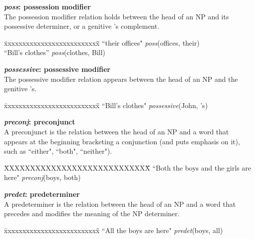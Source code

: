 \documentclass[11pt,letter]{article}
\begin{document}
\noindent\textbf{\emph{poss}: possession modifier}\\
The possession modifier relation holds between the head of an NP and its possessive determiner, or a genitive 's complement.
\begin{tabbing}
\hspace{1cm} \= xxxxxxxxxxxxxxxxxxxxxxxxxx\= \hspace{.5cm}\=  \kill
\>  ``their offices" \> \> \emph{poss}(offices, their)\\
\> ``Bill's clothes'' \> \> \emph{poss}(clothes, Bill)\\
\end{tabbing}

\noindent\textbf{\emph{possessive}: possessive modifier}\\
The possessive modifier relation appears between the head of an NP and the genitive 's.
\begin{tabbing}
\hspace{1cm} \= xxxxxxxxxxxxxxxxxxxxxxxxxx\= \hspace{.5cm}\=  \kill
\>  ``Bill's clothes" \> \> \emph{possessive}(John, 's)\\
\end{tabbing}

\noindent\textbf{\emph{preconj}: preconjunct}\\
A preconjunct is the relation between the head of an NP and a word that appears at the beginning bracketing a conjunction (and puts emphasis on it), such as ``either", ``both", ``neither").
\begin{tabbing}
	\hspace{1cm} \=XXXXXXXXXXXXXXXXXXXXXXXXXXXX\= \hspace{1cm}\=  \kill
\>  ``Both the boys and the girls are here" \> \> \emph{preconj}(boys, both)\\
\end{tabbing}

\noindent\textbf{\emph{predet}: predeterminer}\\
A predeterminer is the relation between the head of an NP and a word that precedes and modifies the meaning of the NP determiner.
\begin{tabbing}
\hspace{1cm} \= xxxxxxxxxxxxxxxxxxxxxxxxxx\= \hspace{.5cm}\=  \kill
\>  ``All the boys are here" \> \> \emph{predet}(boys, all)\\
\end{tabbing}
\end{document}
